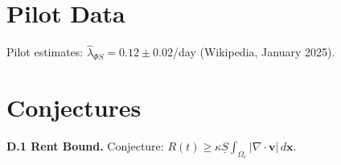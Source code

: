 \documentclass[11pt]{article}
\begin{document}
\section{Pilot Data}
Pilot estimates: \(\widehat{\lambda}_{\Phi S} = 0.12 \pm 0.02\)/day (Wikipedia, January 2025).

\section{Conjectures}
\textbf{D.1 Rent Bound.} Conjecture: \(R(t) \geq \kappa \underline{S} \int_{\Omega_c} |\nabla \cdot \mathbf{v}| \, d\mathbf{x}\).




\printglossaries
\end{document}
